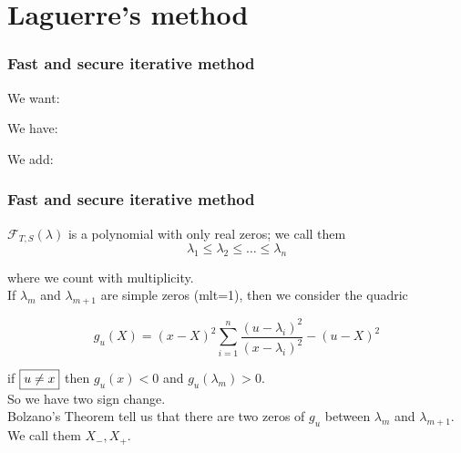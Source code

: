 \documentclass{beamer}
\newcommand{\effe}[2]{\mathcal{F}_{#1}(#2)}
\theoremstyle{definition} \newtheorem{de}{Def}
\theoremstyle{remark} \newtheorem{os}[de]{Oss}
\theoremstyle{plain} \newtheorem{te}[de]{Teo}
\theoremstyle{plain} \newtheorem{co}[de]{Cor}
\theoremstyle{plain} \newtheorem{pr}[de]{Prop}
\theoremstyle{plain} \newtheorem{lem}[de]{Lemm}
\theoremstyle{remark} \newtheorem{rem}[de]{Remark}
\begin{document}
\section{Laguerre's method}

\begin{frame}
\frametitle{Fast and secure iterative method}

\begin{Bdescription}
  \item [We want:]
  
  \item [We have:]

  \item [We add:]
\end{Bdescription}
\end{frame}


\begin{frame}
\frametitle{Fast and secure iterative method}

$\effe{T,S}{\lambda}$ is a polynomial with only real zeros; we call them
\begin{equation*}
  \lambda_1 \le \lambda_2 \le \dots \le \lambda_n
\end{equation*}

where we count with multiplicity.\\ 
If $\lambda_m$ and $\lambda_{m+1}$ are simple zeros (mlt=1), then we consider the quadric

\begin{equation*}
  g_{u}(X) = (x-X)^2 \sum_{i=1}^n \frac{(u-\lambda_i)^2}{(x-\lambda_i)^2} - (u-X)^2
\end{equation*}

if $\fbox{$u\neq x$}$ then $g_u(x)<0$ and $g_u(\lambda_m)>0$. \\
So we have two sign change. \\
Bolzano's Theorem tell us that there are two zeros of $g_u$ between $\lambda_m$ and $\lambda_{m+1}$. We call them $X_{-},X_{+}$.

\end{frame}
\end{document}
